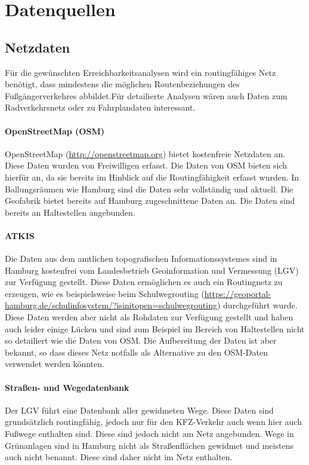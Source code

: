 \documentclass[a4paper,11pt,bibliography=totoc, listof=totoc,titlepage]{scrartcl}
\begin{document}
\section{Datenquellen}
\subsection{Netzdaten}
Für die gewünschten Erreichbarkeitsanalysen wird ein routingfähiges Netz benötigt, dass mindestens die möglichen Routenbeziehungen des Fußgängerverkehres abbildet.Für detailierte Analysen wären auch Daten zum Radverkehrsnetz oder zu Fahrplandaten interessant.


\paragraph{OpenStreetMap (OSM)} OpenStreetMap (\url{http://openstreetmap.org}) bietet kostenfreie Netzdaten an. Diese Daten wurden von Freiwilligen erfasst. Die Daten von OSM bieten sich hierfür an, da sie bereits im Hinblick auf die Routingfähigkeit erfasst wurden. In Ballungsräumen wie Hamburg sind die Daten sehr vollständig und aktuell. Die Geofabrik bietet bereits auf Hamburg zugeschnittene Daten an. Die Daten sind bereits an Haltestellen angebunden.

\paragraph{ATKIS} Die Daten aus dem amtlichen topografischen Informationssystemes sind in Hamburg kostenfrei vom Landesbetrieb Geoinformation und Vermessung (LGV) zur Verfügung gestellt. Diese Daten ermöglichen es auch ein Routingnetz zu erzeugen, wie es beispielsweise beim Schulwegrouting (\url{https://geoportal-hamburg.de/schulinfosystem/?isinitopen=schulwegrouting}) durchgeführt wurde. Diese Daten werden aber nicht als Rohdaten zur Verfügung gestellt und haben auch leider einige Lücken und sind zum Beispiel im Bereich von Haltestellen nicht so detailiert wie die Daten von OSM. Die Aufbereitung der Daten ist aber bekannt, so dass dieses Netz notfalls als Alternative zu den OSM-Daten verwendet werden könnten.

\paragraph{Straßen- und Wegedatenbank} Der LGV führt eine Datenbank aller gewidmeten Wege. Diese Daten sind grundsätzlich routingfähig, jedoch nur für den KFZ-Verkehr auch wenn hier auch Fußwege enthalten sind. Diese sind jedoch nicht am Netz angebunden. Wege in Grünanlagen sind in Hamburg nicht als Straßenflächen gewidmet und meistens auch nicht benannt. Diese sind daher nicht im Netz enthalten. \citep{hhsib}
\end{document}
